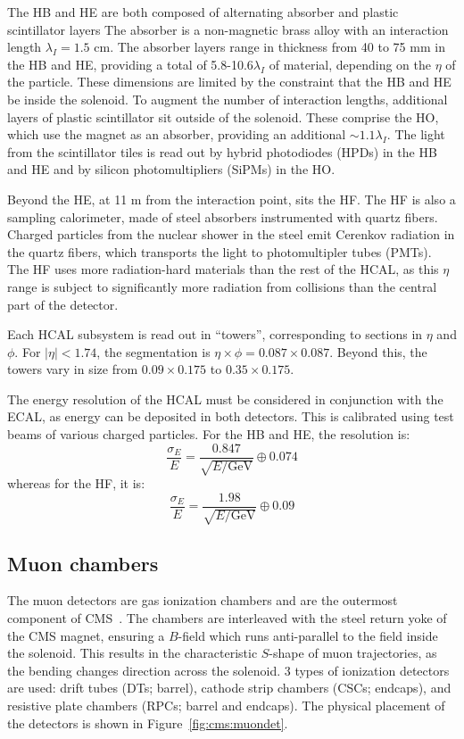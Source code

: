 The HB and HE are both composed of alternating absorber and plastic scintillator layers
The absorber is a non-magnetic brass alloy with an interaction length $\lambda_I=1.5$ cm.
The absorber layers range in thickness from 40 to 75 mm in the HB and HE, providing a total of 5.8-10.6$\lambda_I$ of material, depending on the $\eta$ of the particle.
These dimensions are limited by the constraint that the HB and HE be inside the solenoid. 
To augment the number of interaction lengths, additional layers of plastic scintillator sit outside of the solenoid.
These comprise the HO, which use the magnet as an absorber, providing an additional $\sim 1.1\lambda_I$.
The light from the scintillator tiles is read out by hybrid photodiodes (HPDs) in the HB and HE and by silicon photomultipliers (SiPMs) in the HO. 

Beyond the HE, at 11 m from the interaction point, sits the HF.
The HF is also a sampling calorimeter, made of steel absorbers instrumented with quartz fibers.
Charged particles from the nuclear shower in the steel emit Cerenkov radiation in the quartz fibers, which transports the light to photomultipler tubes (PMTs).
The HF uses more radiation-hard materials than the rest of the HCAL, as this $\eta$ range is subject to significantly more radiation from collisions than the central part of the detector. 

Each HCAL subsystem is read out in ``towers'', corresponding to sections in $\eta$ and $\phi$.
For $|\eta|<1.74$, the segmentation is $\eta\times\phi = 0.087\times0.087$.
Beyond this, the towers vary in size from $0.09\times0.175$  to $0.35\times0.175$.

The energy resolution of the HCAL must be considered in conjunction with the ECAL, as energy can be deposited in both detectors.
This is calibrated using test beams of various charged particles.
For the HB and HE, the resolution is:
\begin{equation}
	\frac{\sigma_E}{E} = \frac{0.847}{\sqrt{E/\mathrm{GeV}}} \oplus 0.074
\end{equation}
whereas for the HF, it is:
\begin{equation}
	\frac{\sigma_E}{E} = \frac{1.98}{\sqrt{E/\mathrm{GeV}}} \oplus 0.09
\end{equation}

\subsection{Muon chambers}

The muon detectors are gas ionization chambers and are the outermost component of CMS~\cite{cmsmuon}. 
The chambers are interleaved with the steel return yoke of the CMS magnet, ensuring a $B$-field which runs anti-parallel to the field inside the solenoid.
This results in the characteristic $S$-shape of muon trajectories, as the bending changes direction across the solenoid. 
3 types of ionization detectors are used: drift tubes (DTs; barrel), cathode strip chambers (CSCs; endcaps), and resistive plate chambers (RPCs; barrel and endcaps).
The physical placement of the detectors is shown in Figure~\ref{fig:cms:muondet}.

